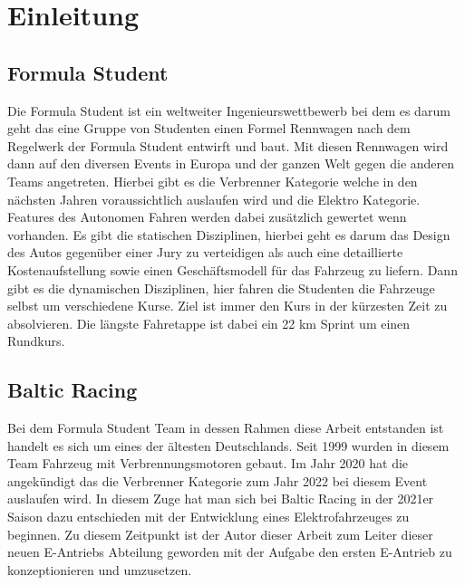 


\chapter{Einleitung}

\section{Formula Student}
Die Formula Student ist ein weltweiter Ingenieurswettbewerb bei dem es darum geht das eine Gruppe von Studenten einen Formel Rennwagen nach dem Regelwerk der Formula Student entwirft und baut. Mit diesen Rennwagen wird dann auf den diversen Events in Europa und der ganzen Welt gegen die anderen Teams angetreten. Hierbei gibt es die Verbrenner Kategorie welche in den nächsten Jahren voraussichtlich auslaufen wird und die Elektro Kategorie. Features des Autonomen Fahren werden dabei zusätzlich gewertet wenn vorhanden. Es gibt die statischen Disziplinen, hierbei geht es darum das Design des Autos gegenüber einer Jury zu verteidigen als auch eine detaillierte Kostenaufstellung sowie einen Geschäftsmodell für das Fahrzeug zu liefern. Dann gibt es die dynamischen Disziplinen, hier fahren die Studenten die Fahrzeuge selbst um verschiedene Kurse. Ziel ist immer den Kurs in der kürzesten Zeit zu absolvieren. Die längste Fahretappe ist dabei ein 22 km Sprint um einen Rundkurs.

\section{Baltic Racing}
Bei dem Formula Student Team in dessen Rahmen diese Arbeit entstanden ist handelt es sich um eines der ältesten Deutschlands. Seit 1999 wurden in diesem Team Fahrzeug mit Verbrennungsmotoren gebaut. Im Jahr 2020 hat die  angekündigt das die Verbrenner Kategorie zum Jahr 2022 bei diesem Event auslaufen wird. In diesem Zuge hat man sich bei Baltic Racing in der 2021er Saison dazu entschieden mit der Entwicklung eines Elektrofahrzeuges zu beginnen. Zu diesem Zeitpunkt ist der Autor dieser Arbeit zum Leiter dieser neuen E-Antriebs Abteilung geworden mit der Aufgabe den ersten E-Antrieb zu konzeptionieren und umzusetzen.

